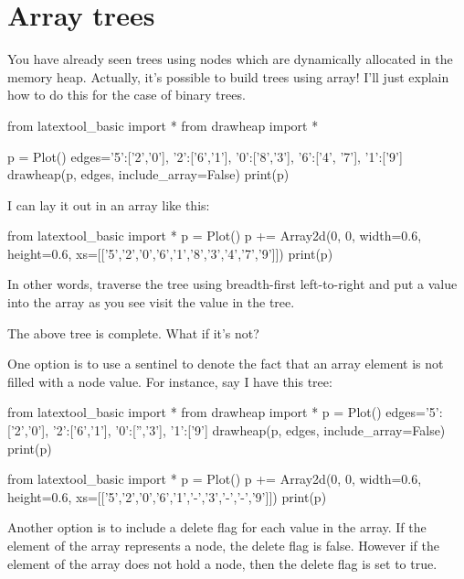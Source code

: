 \section{Array trees}

You have already seen trees using nodes which are dynamically
allocated in the memory heap.
Actually, it's possible to build trees using array!
I'll just explain how to do this for the case of binary trees.

\begin{python}
from latextool_basic import *
from drawheap import *

p = Plot()
edges={'5':['2','0'],
       '2':['6','1'],
       '0':['8','3'],
       '6':['4', '7'],
       '1':['9']}
drawheap(p, edges, include_array=False)
print(p)
\end{python}

I can lay it out in an array like this:

\begin{python}
from latextool_basic import *
p = Plot()
p += Array2d(0, 0, width=0.6, height=0.6, 
             xs=[['5','2','0','6','1','8','3','4','7','9']])
print(p)
\end{python}

In other words, traverse the tree using breadth-first left-to-right
and put a value into the array as you see visit the value in the tree.

The above tree is complete.
What if it's not?

One option is to use a sentinel to denote the
fact that an array element is not filled with a node value.
For instance, say I have this tree:

\begin{python}
from latextool_basic import *
from drawheap import *
p = Plot()
edges={'5':['2','0'],
       '2':['6','1'],
       '0':['','3'],
       '1':['9']}
drawheap(p, edges, include_array=False)
print(p)
\end{python}

\begin{python}
from latextool_basic import *
p = Plot()
p += Array2d(0, 0, width=0.6, height=0.6, 
             xs=[['5','2','0','6','1','-','3','-','-','9']])
print(p)
\end{python}

Another option is to include a delete flag
for each value in the array.
If the element of the array represents a node,
the delete flag is false.
However if the element of the array does not hold a node,
then the delete flag is set to true.



